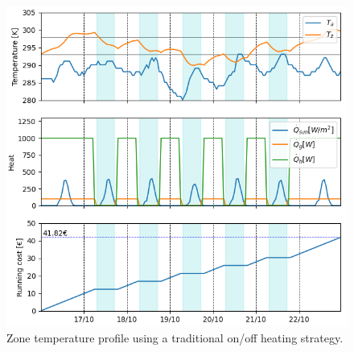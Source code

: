 \begin{figure}[H]
\centering
\includegraphics[scale=0.8]{images/onoff_radiator.png}
\caption{Zone temperature profile using a traditional on/off heating strategy.}
\label{fig:onoff_radiator}
\end{figure}

